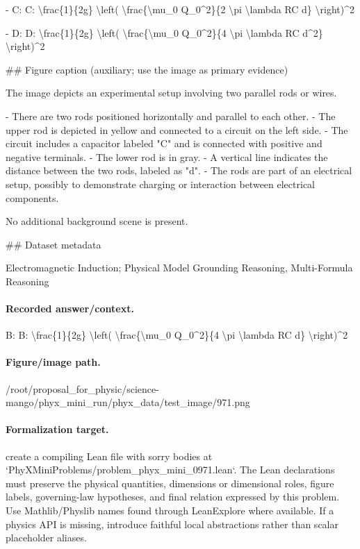 - C: C: \textbackslash{}frac\{1\}\{2g\} \textbackslash{}left( \textbackslash{}frac\{\textbackslash{}mu\_0 Q\_0\textasciicircum{}2\}\{2 \textbackslash{}pi \textbackslash{}lambda RC d\} \textbackslash{}right)\textasciicircum{}2

- D: D: \textbackslash{}frac\{1\}\{2g\} \textbackslash{}left( \textbackslash{}frac\{\textbackslash{}mu\_0 Q\_0\textasciicircum{}2\}\{4 \textbackslash{}pi \textbackslash{}lambda RC d\textasciicircum{}2\} \textbackslash{}right)\textasciicircum{}2

\#\# Figure caption (auxiliary; use the image as primary evidence)

The image depicts an experimental setup involving two parallel rods or wires. 

- There are two rods positioned horizontally and parallel to each other. 
- The upper rod is depicted in yellow and connected to a circuit on the left side.
- The circuit includes a capacitor labeled "C" and is connected with positive and negative terminals.
- The lower rod is in gray.
- A vertical line indicates the distance between the two rods, labeled as "d".
- The rods are part of an electrical setup, possibly to demonstrate charging or interaction between electrical components. 

No additional background scene is present.

\#\# Dataset metadata

Electromagnetic Induction; Physical Model Grounding Reasoning, Multi-Formula Reasoning

\paragraph{Recorded answer/context.}
B: B: \textbackslash{}frac\{1\}\{2g\} \textbackslash{}left( \textbackslash{}frac\{\textbackslash{}mu\_0 Q\_0\textasciicircum{}2\}\{4 \textbackslash{}pi \textbackslash{}lambda RC d\} \textbackslash{}right)\textasciicircum{}2

\paragraph{Figure/image path.}
/root/proposal\_for\_physic/science-mango/phyx\_mini\_run/phyx\_data/test\_image/971.png

\paragraph{Formalization target.}
create a compiling Lean file with sorry bodies at `PhyXMiniProblems/problem\_phyx\_mini\_0971.lean`. The Lean declarations must preserve the physical quantities, dimensions or dimensional roles, figure labels, governing-law hypotheses, and final relation expressed by this problem.
Use Mathlib/Physlib names found through LeanExplore where available. If a physics API is missing, introduce faithful local abstractions rather than scalar placeholder aliases.

